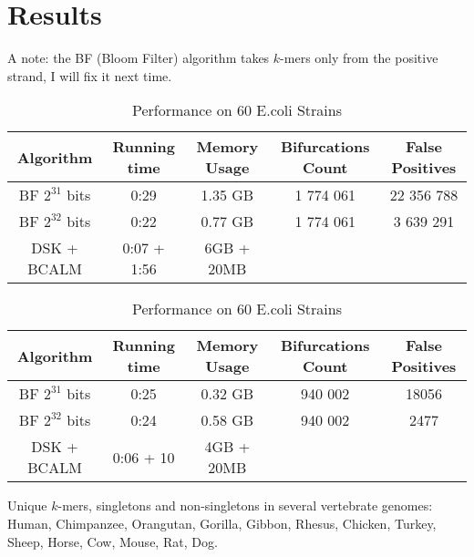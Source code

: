 \documentclass[a4paper, 12pt]{scrartcl}
\begin{document}
\section{Results}
A note: the BF (Bloom Filter) algorithm takes $k$-mers only from the positive strand, I will fix it next time.
\begin{table}[h]

\begin{center}
\caption{Performance Human Chromosome 1}
\begin{tabular}{ccccc}
\hline
Algorithm  & Running time & Memory Usage & Bifurcations Count & False Positives\\
\hline
BF $2^{31}$ bits & 0:29 & 1.35 GB & 1 774 061 & 22 356 788 \\
BF $2^{32}$ bits & 0:22 & 0.77 GB & 1 774 061 & 3 639 291  \\
DSK + BCALM   & 0:07 + 1:56 & 6GB + 20MB & \\
\hline
\end{tabular}

\caption{Performance on 60 E.coli Strains}
\begin{tabular}{ccccc}
\hline
Algorithm  & Running time & Memory Usage & Bifurcations Count & False Positives\\
\hline
BF $2^{31}$ bits & 0:25 & 0.32 GB & 940 002 & 18056 \\
BF $2^{32}$ bits & 0:24 & 0.58 GB & 940 002 & 2477  \\
DSK + BCALM   & 0:06 + 10 &  4GB + 20MB & \\
\hline
\end{tabular}
\end{center}
\end{table}
\pagebreak

Unique $k$-mers, singletons and non-singletons in several vertebrate genomes: Human, Chimpanzee, Orangutan, Gorilla, Gibbon, Rhesus, Chicken, Turkey, Sheep, Horse, Cow, Mouse, Rat, Dog.
\end{document}
